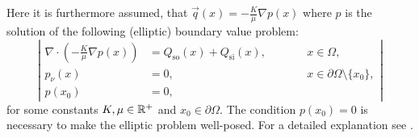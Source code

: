\documentclass[paper=a4, fontsize=12pt,parskip=half,draft,headings=small]{scrartcl}
\newcommand{\Qso}{Q_{\mathrm{so}}}
\newcommand{\Qsi}{Q_{\mathrm{si}}}
\newcommand{\q}{\vec{q}}
\begin{document}
\begin{remark}
			
			Here it is furthermore assumed, that $\q(x) = -\frac{K}{\mu}\nabla p(x)$ where $p$ is the solution of the following (elliptic) boundary value problem:
			\begin{equation}\label{eq:Darcy}
				\left\vert
					\begin{alignedat}{2}
						\nabla \cdot  \left(-\frac{K}{\mu} \nabla p(x) \right) &= \Qso(x) + \Qsi(x), & \qquad &x\in \Omega, \\
						p_\nu(x) &= 0, && x \in \partial \Omega\setminus\{x_0\},\\
						p(x_0)     &= 0, &&
					\end{alignedat}
				\right\vert
			\end{equation}
			for some constants $K,\mu \in \mathbb{R}^+$ and $x_0 \in \partial \Omega$.
			The condition $p(x_0)=0$ is necessary to make the elliptic problem well-posed.
			For a detailed explanation see \cite{BergenMIC15}.
		\end{remark}
		
\end{document}
